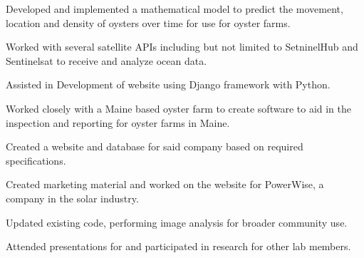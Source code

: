 \documentclass[letterpaper]{deedy-resume} %
\begin{document}
\begin{minipage}[t]{0.66\textwidth}
        \vspace{\topsep} %
        \begin{tightitemize}
            \item Developed and implemented a mathematical model to predict the movement, location and density of oysters over time for use for oyster farms.
            \item Worked with several satellite APIs including but not limited to SetninelHub and Sentinelsat to receive and analyze ocean data.
            \item Assisted in Development of website using Django framework with Python.
        \end{tightitemize}

        \sectionspace %



        \vspace{\topsep} %
        \begin{tightitemize}
            \item Worked closely with a Maine based oyster farm to create software to aid in the inspection and reporting for oyster farms in Maine.
            \item Created a website and database for said company based on required specifications.
            \item Created marketing material and worked on the website for PowerWise, a company in the solar industry.
        \end{tightitemize}

        \sectionspace %



        \vspace{\topsep} %
        \begin{tightitemize}
            \item Updated existing code, performing image analysis for broader community use.
            \item Attended presentations for and participated in research for other lab members.
        \end{tightitemize}


\end{minipage}
\end{document}
